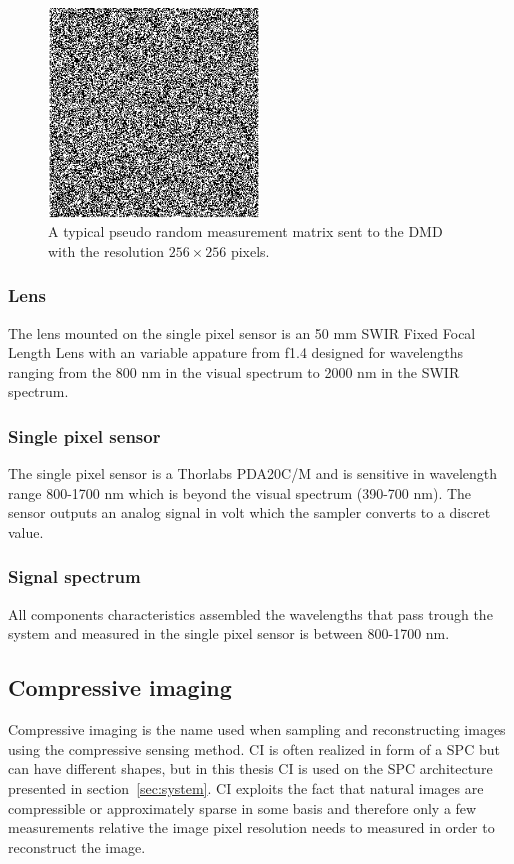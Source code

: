 \begin{figure}[H]
    \centering
    \includegraphics[width = 0.5\textwidth]{gfx/DMD_pattern.png}
    \caption{A typical pseudo random measurement matrix sent to the DMD with the resolution $256 \times 256$ pixels.}
    \label{fig:dmd_pattern}
\end{figure}



\subsubsection{Lens}
The lens mounted on the single pixel sensor is an 50 mm SWIR Fixed Focal Length Lens with an variable appature from f1.4 designed for wavelengths ranging from the 800 nm in the visual spectrum to 2000 nm in the SWIR spectrum. \cite{website:SWIR_objective}

\subsubsection{Single pixel sensor}
The single pixel sensor is a Thorlabs PDA20C/M and is sensitive in wavelength range 800-1700 nm which is beyond the visual spectrum (390-700 nm). The sensor outputs an analog signal in volt which the sampler converts to a discret value. \cite{manual:PDA}

\subsubsection{Signal spectrum}
All components characteristics assembled the wavelengths that pass trough the system and measured in the single pixel sensor is between 800-1700 nm.



\subsection{Compressive imaging}
\label{sec:CI}
Compressive imaging is the name used when sampling and reconstructing images using the compressive sensing method. CI is often realized in form of a SPC but can have different shapes, but in this thesis CI is used on the SPC architecture presented in section~\ref{sec:system}. CI exploits the fact that natural images are compressible or approximately sparse in some basis and therefore only a few measurements relative the image pixel resolution needs to measured in order to reconstruct the image.\\[0.1in]

